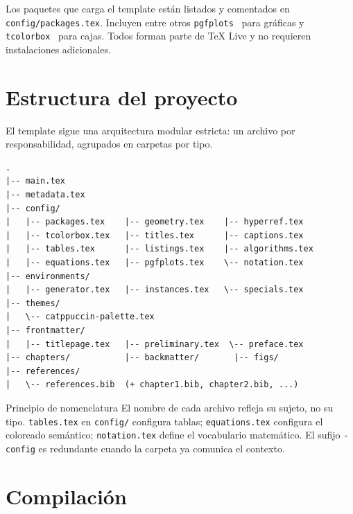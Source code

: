Los paquetes que carga el template están listados y comentados en
\texttt{config/packages.tex}. Incluyen entre otros \texttt{pgfplots}~\cite{pgfplots2023} para gráficas y \texttt{tcolorbox}~\cite{tcolorbox2024} para cajas. Todos forman parte de TeX Live y no requieren
instalaciones adicionales.

\section{Estructura del proyecto}
\label{sec:estructura}

El template sigue una arquitectura modular estricta: un archivo por
responsabilidad, agrupados en carpetas por tipo.

\begin{center}
\ttfamily\scriptsize\color{maintext}
\begin{verbatim}
.
|-- main.tex
|-- metadata.tex
|-- config/
|   |-- packages.tex    |-- geometry.tex    |-- hyperref.tex
|   |-- tcolorbox.tex   |-- titles.tex      |-- captions.tex
|   |-- tables.tex      |-- listings.tex    |-- algorithms.tex
|   |-- equations.tex   |-- pgfplots.tex    \-- notation.tex
|-- environments/
|   |-- generator.tex   |-- instances.tex   \-- specials.tex
|-- themes/
|   \-- catppuccin-palette.tex
|-- frontmatter/
|   |-- titlepage.tex   |-- preliminary.tex  \-- preface.tex
|-- chapters/           |-- backmatter/       |-- figs/
|-- references/
|   \-- references.bib  (+ chapter1.bib, chapter2.bib, ...)
\end{verbatim}
\end{center}

\begin{observacion}{Principio de nomenclatura}
El nombre de cada archivo refleja su sujeto, no su tipo. \texttt{tables.tex}
en \texttt{config/} configura tablas; \texttt{equations.tex} configura el
coloreado semántico; \texttt{notation.tex} define el vocabulario matemático.
El sufijo \texttt{-config} es redundante cuando la carpeta ya comunica el
contexto.
\end{observacion}

\section{Compilación}
\label{sec:compilacion}

